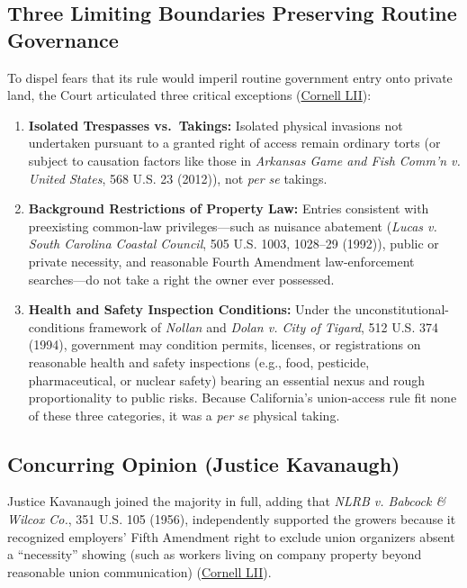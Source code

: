 \documentclass[12pt]{article}
\begin{document}
\subsection{Three Limiting Boundaries Preserving Routine Governance}
To dispel fears that its rule would imperil routine government entry onto private land, the Court articulated three critical exceptions (\href{https://www.law.cornell.edu/supremecourt/text/20-107}{Cornell LII}):
\begin{enumerate}
    \item \textbf{Isolated Trespasses vs.\ Takings:} Isolated physical invasions not undertaken pursuant to a granted right of access remain ordinary torts (or subject to causation factors like those in \textit{Arkansas Game and Fish Comm'n v. United States}, 568 U.S. 23 (2012)), not \emph{per se} takings.
    \item \textbf{Background Restrictions of Property Law:} Entries consistent with preexisting common-law privileges---such as nuisance abatement (\textit{Lucas v. South Carolina Coastal Council}, 505 U.S. 1003, 1028--29 (1992)), public or private necessity, and reasonable Fourth Amendment law-enforcement searches---do not take a right the owner ever possessed.
    \item \textbf{Health and Safety Inspection Conditions:} Under the unconstitutional-conditions framework of \textit{Nollan} and \textit{Dolan v. City of Tigard}, 512 U.S. 374 (1994), government may condition permits, licenses, or registrations on reasonable health and safety inspections (e.g., food, pesticide, pharmaceutical, or nuclear safety) bearing an essential nexus and rough proportionality to public risks. Because California's union-access rule fit none of these three categories, it was a \emph{per se} physical taking.
\end{enumerate}

\subsection{Concurring Opinion (Justice Kavanaugh)}

Justice Kavanaugh joined the majority in full, adding that \textit{NLRB v. Babcock \& Wilcox Co.}, 351 U.S. 105 (1956), independently supported the growers because it recognized employers' Fifth Amendment right to exclude union organizers absent a ``necessity'' showing (such as workers living on company property beyond reasonable union communication) (\href{https://www.law.cornell.edu/supremecourt/text/20-107}{Cornell LII}).
\end{document}
